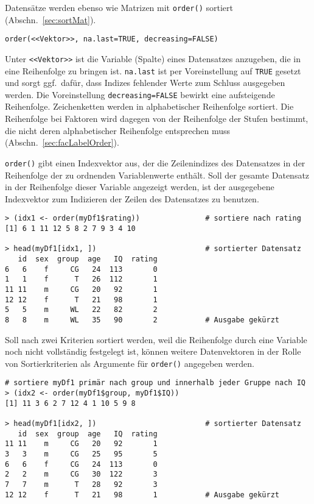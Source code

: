 Datensätze werden ebenso wie Matrizen mit \lstinline!order()! sortiert (Abschn.\ \ref{sec:sortMat}).
\begin{lstlisting}
order(<<Vektor>>, na.last=TRUE, decreasing=FALSE)
\end{lstlisting}

Unter \lstinline!<<Vektor>>! ist die Variable (Spalte) eines Datensatzes anzugeben, die in eine Reihenfolge zu bringen ist. \lstinline!na.last! ist per Voreinstellung auf \lstinline!TRUE! gesetzt und sorgt ggf.\ dafür, dass Indizes fehlender Werte zum Schluss ausgegeben werden. Die Voreinstellung \lstinline!decreasing=FALSE! bewirkt eine aufsteigende Reihenfolge. Zeichenketten werden in alphabetischer Reihenfolge sortiert. Die Reihenfolge bei Faktoren wird dagegen von der Reihenfolge der Stufen bestimmt, die nicht deren alphabetischer Reihenfolge entsprechen muss (Abschn.\ \ref{sec:facLabelOrder}).

\lstinline!order()! gibt einen Indexvektor aus, der die Zeilenindizes des Datensatzes in der Reihenfolge der zu ordnenden Variablenwerte enthält. Soll der gesamte Datensatz in der Reihenfolge dieser Variable angezeigt werden, ist der ausgegebene Indexvektor zum Indizieren der Zeilen des Datensatzes zu benutzen.
\begin{lstlisting}
> (idx1 <- order(myDf1$rating))               # sortiere nach rating
[1] 6 1 11 12 5 8 2 7 9 3 4 10

> head(myDf1[idx1, ])                         # sortierter Datensatz
   id  sex  group  age   IQ  rating
6   6    f     CG   24  113       0
1   1    f      T   26  112       1
11 11    m     CG   20   92       1
12 12    f      T   21   98       1
5   5    m     WL   22   82       2
8   8    m     WL   35   90       2           # Ausgabe gekürzt
\end{lstlisting}

Soll nach zwei Kriterien sortiert werden, weil die Reihenfolge durch eine Variable noch nicht vollständig festgelegt ist, können weitere Datenvektoren in der Rolle von Sortierkriterien als Argumente für \lstinline!order()! angegeben werden.
\begin{lstlisting}
# sortiere myDf1 primär nach group und innerhalb jeder Gruppe nach IQ
> (idx2 <- order(myDf1$group, myDf1$IQ))
[1] 11 3 6 2 7 12 4 1 10 5 9 8

> head(myDf1[idx2, ])                         # sortierter Datensatz
   id  sex  group  age   IQ  rating
11 11    m     CG   20   92       1
3   3    m     CG   25   95       5
6   6    f     CG   24  113       0
2   2    m     CG   30  122       3
7   7    m      T   28   92       3
12 12    f      T   21   98       1           # Ausgabe gekürzt
\end{lstlisting}

